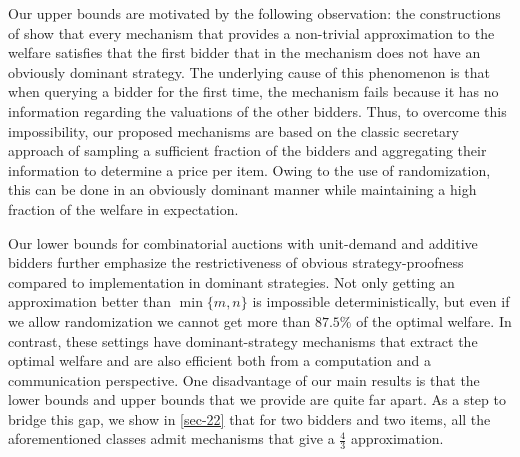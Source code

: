 

{Our upper bounds are motivated by the following observation:
the constructions of \cite{Ron24}
show 
that
every  mechanism that provides a non-trivial approximation to the welfare satisfies that the first bidder that  in the mechanism does not have an obviously dominant strategy. The underlying cause of this  phenomenon is that when querying a bidder for the first time, the mechanism fails because it has no information regarding the valuations of the other bidders. 
Thus, to overcome this impossibility, our proposed mechanisms are based on the classic secretary approach of sampling a sufficient fraction of the bidders and aggregating their information to determine
a price per item. Owing to the use of randomization, this can be done 
in an obviously dominant manner while maintaining a high fraction of the welfare in expectation.}  



Our lower bounds for combinatorial auctions with unit-demand and additive bidders further emphasize 
the restrictiveness of obvious strategy-proofness compared to implementation in dominant strategies. 
Not only getting an approximation better than $\min\{m,n\}$ is impossible deterministically, but even if we allow randomization we cannot get more than $87.5\%$ of the optimal welfare. In contrast, these settings  have  dominant-strategy mechanisms that extract the optimal welfare and are also efficient both from a computation and a communication perspective.
One disadvantage of our main results is that the lower bounds and upper bounds that we provide are quite far apart. As a step to bridge this gap, we show in %
\cref{sec-22} 
that for two bidders and two items, all the aforementioned classes
admit mechanisms that give a $\frac{4}{3}$ approximation.  
